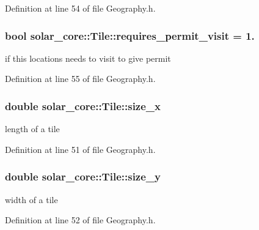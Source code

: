 Definition at line 54 of file Geography.\+h.

\hypertarget{classsolar__core_1_1_tile_a489ba61bbe83f143b98d8a866cf06f13}{}
\subsubsection[{requires\+\_\+permit\+\_\+visit}]{\setlength{\rightskip}{0pt plus 5cm}bool solar\+\_\+core\+::\+Tile\+::requires\+\_\+permit\+\_\+visit = 1.}\label{classsolar__core_1_1_tile_a489ba61bbe83f143b98d8a866cf06f13}
if this locations needs to visit to give permit 

Definition at line 55 of file Geography.\+h.

\hypertarget{classsolar__core_1_1_tile_ae8615b87d6d0c614de01b497fa63c27b}{}
\subsubsection[{size\+\_\+x}]{\setlength{\rightskip}{0pt plus 5cm}double solar\+\_\+core\+::\+Tile\+::size\+\_\+x}\label{classsolar__core_1_1_tile_ae8615b87d6d0c614de01b497fa63c27b}
length of a tile 

Definition at line 51 of file Geography.\+h.

\hypertarget{classsolar__core_1_1_tile_a698ac57539f58ed4e0a54b3135be6fb9}{}
\subsubsection[{size\+\_\+y}]{\setlength{\rightskip}{0pt plus 5cm}double solar\+\_\+core\+::\+Tile\+::size\+\_\+y}\label{classsolar__core_1_1_tile_a698ac57539f58ed4e0a54b3135be6fb9}
width of a tile 

Definition at line 52 of file Geography.\+h.

\hypertarget{classsolar__core_1_1_tile_a2062d4ffe05c6f6282975f71f2d24441}{}
